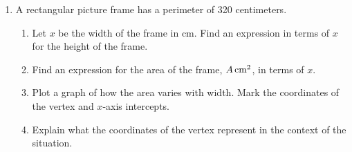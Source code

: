 \documentclass[12pt, twoside]{article}
\begin{document}
\begin{enumerate}
\newpage
\item A rectangular picture frame has a perimeter of 320 centimeters.
    \begin{enumerate}
        \item Let $x$ be the width of the frame in cm. Find an expression in terms of $x$ for the height of the frame. \vspace{2cm}
        \item Find an expression for the area of the frame, $A \,\rm{cm}^2$, in terms of $x$.  \vspace{2cm}
        \item Plot a graph of how the area varies with width. Mark the coordinates of the vertex and $x$-axis intercepts.
        \item Explain what the coordinates of the vertex represent in the context of the situation. \vspace{4cm}
    \end{enumerate}
    \begin{center}
    \end{center}
    

\end{enumerate}
\end{document}
